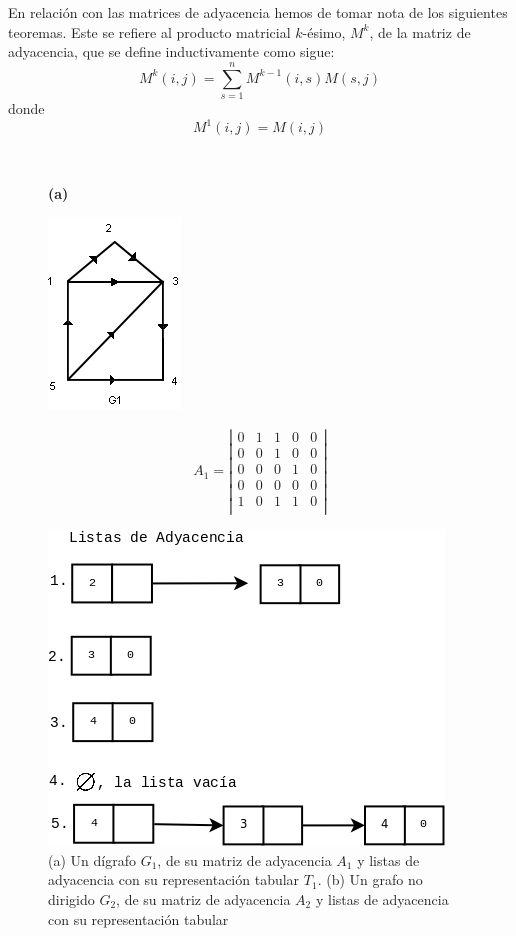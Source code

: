 \documentclass[10pt,a5paper]{book}
\begin{document}
En relación con las matrices de adyacencia hemos de tomar nota de los siguientes teoremas. Este se refiere al producto matricial $k$-ésimo, $M^k$, de la matriz de adyacencia, que se define inductivamente como sigue:
\[M^{k}(i,j) = \sum_{s=1}^{n} M^{k-1}(i,s) M(s,j) \]
donde
\[M^{1}(i,j) = M(i,j) \]
\vfill
\pagebreak
\begin{figure}[H]
\caption{(a) Un dígrafo $G_1$, de su matriz de adyacencia $A_1$ y listas de adyacencia con su representación tabular $T_1$. (b) Un grafo no dirigido $G_2$, de su matriz de adyacencia $A_2$ y listas de adyacencia con su representación tabular}
\hrulefill{}\\
\begin{flushleft}\textbf{(a)}\end{flushleft}
\parbox{1cm}
{
  \begin{flushright}
  \includegraphics[scale=0.61]{Fig1_13_a.png}
  \end{flushright}
}
\hfill
\parbox{3cm}
{
   \begin{flushleft}
    \[A_1 = \left| 
      \begin{array}{ccccc}
        0 & 1 & 1 & 0 & 0 \\
        0 & 0 & 1 & 0 & 0 \\
        0 & 0 & 0 & 1 & 0 \\
        0 & 0 & 0 & 0 & 0 \\
        1 & 0 & 1 & 1 & 0 \\
      \end{array}
    \right|
    \]
  \end{flushleft}
}
\vfill
\parbox{3cm}
{
  \begin{flushleft}
    \includegraphics[scale=0.35]{Fig1_13_a3.png}

\end{flushleft}}
\end{figure}
\end{document}
